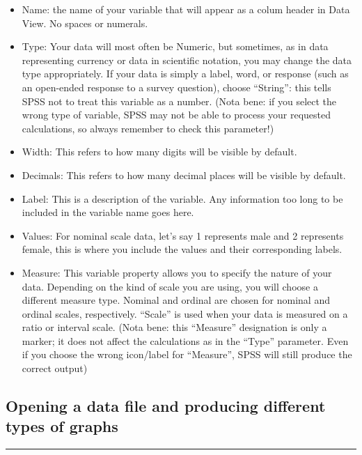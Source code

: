 \documentclass[
]{book}
\providecommand{\tightlist}{%
  \setlength{\itemsep}{0pt}\setlength{\parskip}{0pt}}
\begin{document}
\begin{itemize}
\tightlist
\item
  Name: the name of your variable that will appear as a colum header in Data View. No spaces or numerals.
\item
  Type: Your data will most often be Numeric, but sometimes, as in data representing currency or data in scientific notation, you may change the data type appropriately. If your data is simply a label, word, or response (such as an open-ended response to a survey question), choose ``String'': this tells SPSS not to treat this variable as a number. (Nota bene: if you select the wrong type of variable, SPSS may not be able to process your requested calculations, so always remember to check this parameter!)
\item
  Width: This refers to how many digits will be visible by default.
\item
  Decimals: This refers to how many decimal places will be visible by default.
\item
  Label: This is a description of the variable. Any information too long to be included in the variable name goes here.
\item
  Values: For nominal scale data, let's say 1 represents male and 2 represents female, this is where you include the values and their corresponding labels.
\item
  Measure: This variable property allows you to specify the nature of your data. Depending on the kind of scale you are using, you will choose a different measure type. Nominal and ordinal are chosen for nominal and ordinal scales, respectively. ``Scale'' is used when your data is measured on a ratio or interval scale. (Nota bene: this ``Measure'' designation is only a marker; it does not affect the calculations as in the ``Type'' parameter. Even if you choose the wrong icon/label for ``Measure'', SPSS will still produce the correct output)
\end{itemize}

\hypertarget{opening-a-data-file-and-producing-different-types-of-graphs}{%
\subsection{Opening a data file and producing different types of graphs}\label{opening-a-data-file-and-producing-different-types-of-graphs}}

\begin{center}\rule{0.5\linewidth}{0.5pt}\end{center}
\end{document}
